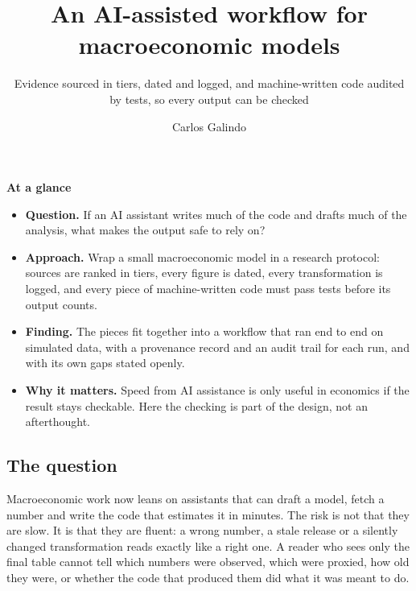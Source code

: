 \documentclass[
  british,
  a4paper,
]{article}
\title{An AI-assisted workflow for macroeconomic models}
\subtitle{Evidence sourced in tiers, dated and logged, and
machine-written code audited by tests, so every output can be checked}
\author{Carlos Galindo}
\date{}
\providecommand{\tightlist}{%
  \setlength{\itemsep}{0pt}\setlength{\parskip}{0pt}}
\begin{document}
\maketitle


\begin{tcolorbox}[enhanced jigsaw, arc=.35mm, bottomrule=.15mm, breakable, colback=white, colframe=quarto-callout-note-color-frame, left=2mm, leftrule=.75mm, opacityback=0, rightrule=.15mm, toprule=.15mm]

\vspace{-3mm}\textbf{At a glance}\vspace{3mm}

\begin{itemize}
\tightlist
\item
  \textbf{Question.} If an AI assistant writes much of the code and
  drafts much of the analysis, what makes the output safe to rely on?
\item
  \textbf{Approach.} Wrap a small macroeconomic model in a research
  protocol: sources are ranked in tiers, every figure is dated, every
  transformation is logged, and every piece of machine-written code must
  pass tests before its output counts.
\item
  \textbf{Finding.} The pieces fit together into a workflow that ran end
  to end on simulated data, with a provenance record and an audit trail
  for each run, and with its own gaps stated openly.
\item
  \textbf{Why it matters.} Speed from AI assistance is only useful in
  economics if the result stays checkable. Here the checking is part of
  the design, not an afterthought.
\end{itemize}

\end{tcolorbox}

\subsection{The question}\label{the-question}

Macroeconomic work now leans on assistants that can draft a model, fetch
a number and write the code that estimates it in minutes. The risk is
not that they are slow. It is that they are fluent: a wrong number, a
stale release or a silently changed transformation reads exactly like a
right one. A reader who sees only the final table cannot tell which
numbers were observed, which were proxied, how old they were, or whether
the code that produced them did what it was meant to do.
\end{document}
